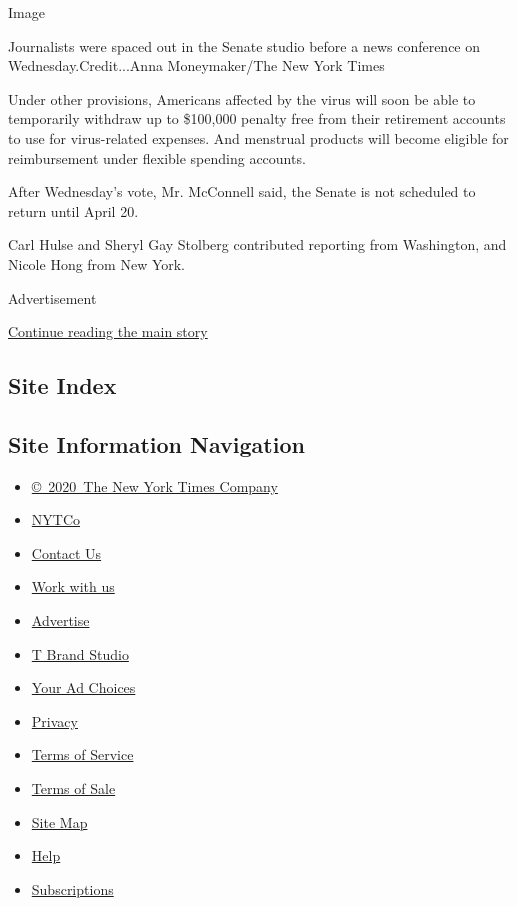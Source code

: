 Image

Journalists were spaced out in the Senate studio before a news
conference on Wednesday.Credit...Anna Moneymaker/The New York Times

Under other provisions, Americans affected by the virus will soon be
able to temporarily withdraw up to \$100,000 penalty free from their
retirement accounts to use for virus-related expenses. And menstrual
products will become eligible for reimbursement under flexible spending
accounts.

After Wednesday's vote, Mr. McConnell said, the Senate is not scheduled
to return until April 20.

Carl Hulse and Sheryl Gay Stolberg contributed reporting from
Washington, and Nicole Hong from New York.

Advertisement

\protect\hyperlink{after-bottom}{Continue reading the main story}

\hypertarget{site-index}{%
\subsection{Site Index}\label{site-index}}

\hypertarget{site-information-navigation}{%
\subsection{Site Information
Navigation}\label{site-information-navigation}}

\begin{itemize}
\tightlist
\item
  \href{https://help.nytimes.com/hc/en-us/articles/115014792127-Copyright-notice}{©~2020~The
  New York Times Company}
\end{itemize}

\begin{itemize}
\tightlist
\item
  \href{https://www.nytco.com/}{NYTCo}
\item
  \href{https://help.nytimes.com/hc/en-us/articles/115015385887-Contact-Us}{Contact
  Us}
\item
  \href{https://www.nytco.com/careers/}{Work with us}
\item
  \href{https://nytmediakit.com/}{Advertise}
\item
  \href{http://www.tbrandstudio.com/}{T Brand Studio}
\item
  \href{https://www.nytimes.com/privacy/cookie-policy\#how-do-i-manage-trackers}{Your
  Ad Choices}
\item
  \href{https://www.nytimes.com/privacy}{Privacy}
\item
  \href{https://help.nytimes.com/hc/en-us/articles/115014893428-Terms-of-service}{Terms
  of Service}
\item
  \href{https://help.nytimes.com/hc/en-us/articles/115014893968-Terms-of-sale}{Terms
  of Sale}
\item
  \href{https://spiderbites.nytimes.com}{Site Map}
\item
  \href{https://help.nytimes.com/hc/en-us}{Help}
\item
  \href{https://www.nytimes.com/subscription?campaignId=37WXW}{Subscriptions}
\end{itemize}
